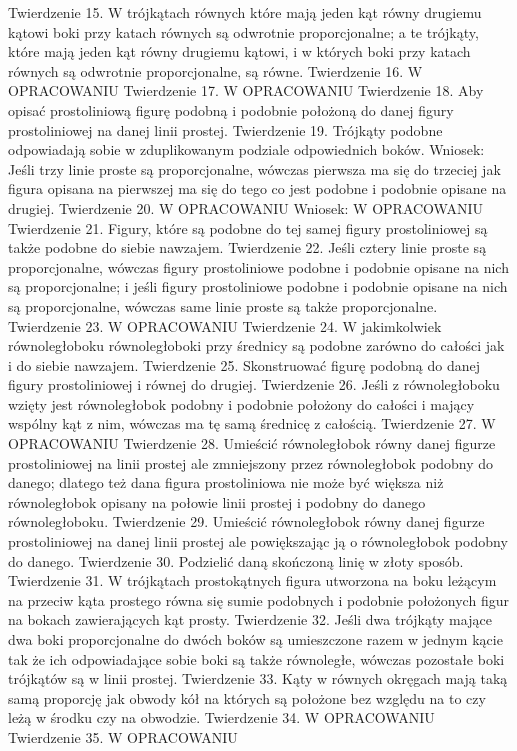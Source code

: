 Twierdzenie 15.
    W trójkątach równych które mają jeden kąt równy drugiemu kątowi boki przy katach równych są odwrotnie proporcjonalne; a te trójkąty, które mają jeden kąt równy drugiemu kątowi, i w których boki przy katach równych są odwrotnie proporcjonalne, są równe.
Twierdzenie 16.
    W OPRACOWANIU
Twierdzenie 17.
    W OPRACOWANIU
Twierdzenie 18.
    Aby opisać prostoliniową figurę podobną i podobnie położoną do danej figury prostoliniowej na danej linii prostej.
Twierdzenie 19.
    Trójkąty podobne odpowiadają sobie w zduplikowanym podziale odpowiednich boków.
    Wniosek:
    Jeśli trzy linie proste są proporcjonalne, wówczas pierwsza ma się do trzeciej jak figura opisana na pierwszej ma się do tego co jest podobne i podobnie opisane na drugiej.
Twierdzenie 20.
    W OPRACOWANIU
    Wniosek:
    W OPRACOWANIU
Twierdzenie 21.
    Figury, które są podobne do tej samej figury prostoliniowej są także podobne do siebie nawzajem.
Twierdzenie 22.
    Jeśli cztery linie proste są proporcjonalne, wówczas figury prostoliniowe podobne i podobnie opisane na nich są proporcjonalne; i jeśli figury prostoliniowe podobne i podobnie opisane na nich są proporcjonalne, wówczas same linie proste są także proporcjonalne.
Twierdzenie 23.
    W OPRACOWANIU
Twierdzenie 24.
    W jakimkolwiek równoległoboku równoległoboki przy średnicy są podobne zarówno do całości jak i do siebie nawzajem.
Twierdzenie 25.
    Skonstruować figurę podobną do danej figury prostoliniowej i równej do drugiej.
Twierdzenie 26.
    Jeśli z równoległoboku wzięty jest równoległobok podobny i podobnie położony do całości i mający wspólny kąt z nim, wówczas ma tę samą średnicę z całością.
Twierdzenie 27.
    W OPRACOWANIU
Twierdzenie 28.
    Umieścić równoległobok równy danej figurze prostoliniowej na linii prostej ale zmniejszony przez równoległobok podobny do danego; dlatego też dana figura prostoliniowa nie może być większa niż równoległobok opisany na połowie linii prostej i podobny do danego równoległoboku.
Twierdzenie 29.
    Umieścić równoległobok równy danej figurze prostoliniowej na danej linii prostej ale powiększając ją o równoległobok podobny do danego.
Twierdzenie 30.
    Podzielić daną skończoną linię w złoty sposób.
Twierdzenie 31.
    W trójkątach prostokątnych figura utworzona na boku leżącym na przeciw kąta prostego równa się sumie podobnych i podobnie położonych figur na bokach zawierających kąt prosty.
Twierdzenie 32.
    Jeśli dwa trójkąty mające dwa boki proporcjonalne do dwóch boków są umieszczone razem w jednym kącie tak że ich odpowiadające sobie boki są także równoległe, wówczas pozostałe boki trójkątów są w linii prostej.
Twierdzenie 33.
    Kąty w równych okręgach mają taką samą proporcję jak obwody kół na których są położone bez względu na to czy leżą w środku czy na obwodzie.
Twierdzenie 34.
    W OPRACOWANIU
Twierdzenie 35.
    W OPRACOWANIU 



